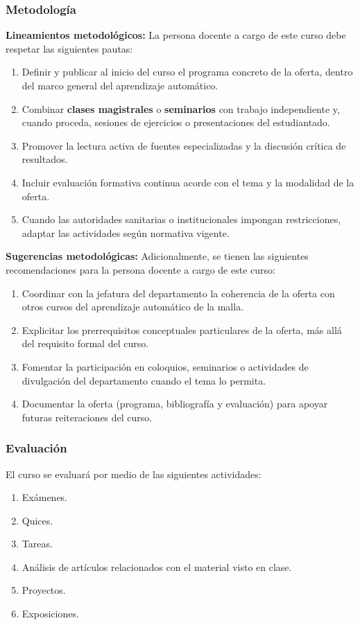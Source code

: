 \begin{refsection}
\subsubsection*{Metodología}

\noindent \textbf{Lineamientos metodológicos:} La persona docente a cargo de este curso debe respetar las siguientes pautas:

\begin{enumerate}
    \item Definir y publicar al inicio del curso el programa concreto de la oferta, dentro del marco general del aprendizaje automático.
    \item Combinar \textbf{clases magistrales} o \textbf{seminarios} con trabajo independiente y, cuando proceda, sesiones de ejercicios o presentaciones del estudiantado.
    \item Promover la lectura activa de fuentes especializadas y la discusión crítica de resultados.
    \item Incluir evaluación formativa continua acorde con el tema y la modalidad de la oferta.
    \item Cuando las autoridades sanitarias o institucionales impongan restricciones, adaptar las actividades según normativa vigente.
\end{enumerate}

\textbf{Sugerencias metodológicas:} Adicionalmente, se tienen las siguientes recomendaciones para la persona docente a cargo de este curso:

\begin{enumerate}
    \item Coordinar con la jefatura del departamento la coherencia de la oferta con otros cursos del aprendizaje automático de la malla.
    \item Explicitar los prerrequisitos conceptuales particulares de la oferta, más allá del requisito formal del curso.
    \item Fomentar la participación en coloquios, seminarios o actividades de divulgación del departamento cuando el tema lo permita.
    \item Documentar la oferta (programa, bibliografía y evaluación) para apoyar futuras reiteraciones del curso.
\end{enumerate}

\subsubsection*{Evaluación}

El curso se evaluará por medio de las siguientes actividades:

\begin{enumerate}
\item Exámenes.
\item Quices.
\item Tareas.
\item Análisis de artículos relacionados con el material visto en clase.
\item Proyectos.
\item Exposiciones.
\end{enumerate}

\end{refsection}
